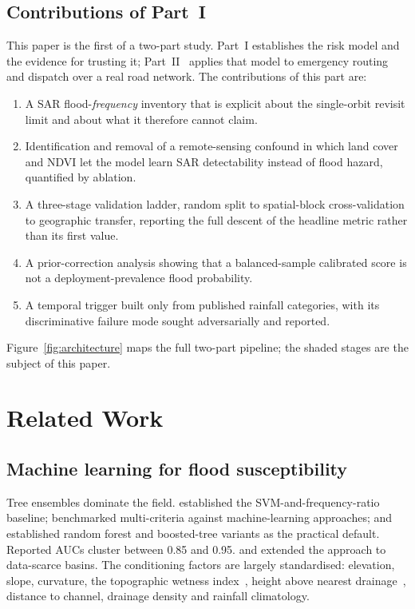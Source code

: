 \documentclass[journal]{IEEEtran}
\begin{document}
\subsection{Contributions of Part~I}
This paper is the first of a two-part study. Part~I establishes the risk model
and the evidence for trusting it; Part~II~\cite{partii} applies that model to
emergency routing and dispatch over a real road network. The contributions of
this part are:
\begin{enumerate}
\item A SAR flood-\emph{frequency} inventory that is explicit about the
      single-orbit revisit limit and about what it therefore cannot claim.
\item Identification and removal of a remote-sensing confound in which land
      cover and NDVI let the model learn SAR detectability instead of flood
      hazard, quantified by ablation.
\item A three-stage validation ladder, random split to spatial-block
      cross-validation to geographic transfer, reporting the full descent of the
      headline metric rather than its first value.
\item A prior-correction analysis showing that a balanced-sample calibrated
      score is not a deployment-prevalence flood probability.
\item A temporal trigger built only from published rainfall categories, with its
      discriminative failure mode sought adversarially and reported.
\end{enumerate}

Figure~\ref{fig:architecture} maps the full two-part pipeline; the shaded stages
are the subject of this paper.
\section{Related Work}
\label{sec:related}

\subsection{Machine learning for flood susceptibility}
Tree ensembles dominate the field. \citet{tehrany2014} established the
SVM-and-frequency-ratio baseline; \citet{khosravi2018} benchmarked multi-criteria
against machine-learning approaches; \citet{arabameri2019} and \citet{saha2021}
established random forest and boosted-tree variants as the practical default.
Reported AUCs cluster between 0.85 and 0.95. \citet{wang2020} and
\citet{avand2021} extended the approach to data-scarce basins.
The conditioning factors are largely standardised: elevation, slope, curvature,
the topographic wetness index~\citep{beven1979}, height above nearest
drainage~\citep{renno2008,nobre2011}, distance to channel, drainage density and
rainfall climatology.
\end{document}
